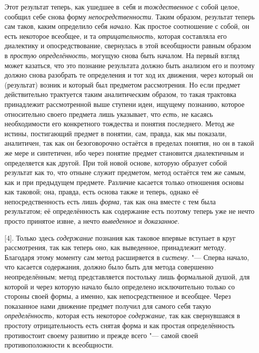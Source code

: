 Этот результат теперь, как ушедшее в~себя и {\em тождественное} с
собой целое, сообщил себе снова форму {\em непосредственности}.
Таким образом, результат теперь сам таков, каким определило
себя {\em начало}. Как
простое соотношение с собой, он есть некоторое всеобщее, и та
{\em отрицательность,}
которая составляла его диалектику и опосредствование,
свернулась в этой всеобщности равным образом в
{\em простую определённость,}
могущую снова быть началом. На первый взгляд может казаться,
что это познание результата должно быть анализом его и поэтому должно снова
разобрать те определения и тот ход их движения, через который он
(результат) возник и который был предметом рассмотрения. Но если предмет
действительно трактуется таким аналитическим образом, то такая трактовка
принадлежит рассмотренной выше ступени идеи, ищущему познанию, которое
относительно своего предмета лишь указывает, что {\em есть,} не касаясь
необходимости его конкретного тождества и понятия последнего. Метод же
истины, постигающий предмет в понятии, сам, правда, как мы показали,
аналитичен, так как он безоговорочно остаётся в пределах понятия, но он в
такой же мере и синтетичен, ибо через понятие предмет становится
диалектичным и определяется как другой. При той новой основе, которую
образует собой результат как то, что отныне служит предметом, метод
остаётся тем же самым, как и при предыдущем предмете. Различие касается
только отношения основы как таковой; она, правда, есть основа также и
теперь, однако её непосредственность есть лишь {\em форма,} так как она
вместе с тем была результатом; её определённость как содержание есть
поэтому теперь уже не нечто просто принятое извне, а нечто
{\em выведенное} и {\em доказанное}.

[4]. Только здесь {\em содержание} познания
как таковое впервые вступает в круг рассмотрения, так как теперь оно, как
выведенное, принадлежит методу. Благодаря этому моменту сам метод
расширяется в {\em систему}. "---
Сперва начало, что касается содержания, должно было быть для
метода совершенно неопределённым; метод представляется постольку лишь
формальной душой, для которой и через которую начало было определено
исключительно только со стороны своей формы, а именно, как непосредственное
и всеобщее. Через показанное нами движение предмет получил для самого себя
такую {\em определённость,} которая есть некоторое {\em содержание,} так как
свернувшаяся в простоту отрицательность есть снятая форма и как простая
определённость противостоит своему развитию и прежде всего
"--- самой своей противоположности к всеобщности.

